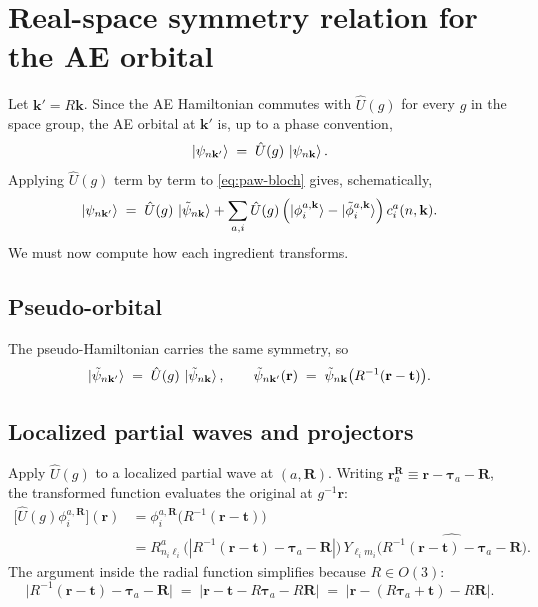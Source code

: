 \documentclass[11pt,a4paper]{article}
\newcommand{\rr}{\mathbf{r}}
\newcommand{\kk}{\mathbf{k}}
\newcommand{\RR}{\mathbf{R}}
\newcommand{\tautau}{\boldsymbol{\tau}}
\newcommand{\tvec}{\mathbf{t}}
\newcommand{\Uhat}{\hat{U}}
\begin{document}
\section{Real-space symmetry relation for the AE orbital}

Let $\kk' = R\kk$. Since the AE Hamiltonian commutes with $\Uhat(g)$ for
every $g$ in the space group, the AE orbital at $\kk'$ is, up to a phase
convention,
\begin{equation}
\ket{\psi_{n\kk'}} \;=\; \Uhat(g)\,\ket{\psi_{n\kk}}.
\label{eq:AE-symm}
\end{equation}
Applying $\Uhat(g)$ term by term to \eqref{eq:paw-bloch} gives, schematically,
\begin{equation}
\ket{\psi_{n\kk'}}
  \;=\; \Uhat(g)\,\ket{\tilde\psi_{n\kk}}
  + \sum_{a,i}\Uhat(g)\,
    \Bigl(\ket{\phi_i^{a,\kk}} - \ket{\tilde\phi_i^{a,\kk}}\Bigr)\,
    c_i^a(n,\kk).
\end{equation}
We must now compute how each ingredient transforms.

\subsection{Pseudo-orbital}

The pseudo-Hamiltonian carries the same symmetry, so
\begin{equation}
\ket{\tilde\psi_{n\kk'}} \;=\; \Uhat(g)\,\ket{\tilde\psi_{n\kk}},
\qquad
\tilde\psi_{n\kk'}(\rr) \;=\; \tilde\psi_{n\kk}\bigl(R^{-1}(\rr - \tvec)\bigr).
\label{eq:pseudo-symm}
\end{equation}

\subsection{Localized partial waves and projectors}

Apply $\Uhat(g)$ to a localized partial wave at $(a,\RR)$. Writing
$\rr_a^{\RR} \equiv \rr - \tautau_a - \RR$, the transformed function evaluates
the original at $g^{-1}\rr$:
\begin{align}
\bigl[\Uhat(g)\phi_i^{a,\RR}\bigr](\rr)
  &= \phi_i^{a,\RR}\!\bigl(R^{-1}(\rr - \tvec)\bigr) \nonumber\\
  &= R_{n_i\ell_i}^a\bigl(|R^{-1}(\rr - \tvec) - \tautau_a - \RR|\bigr)\,
     Y_{\ell_i m_i}\bigl(\widehat{R^{-1}(\rr - \tvec) - \tautau_a - \RR}\bigr).
\end{align}
The argument inside the radial function simplifies because $R \in O(3)$:
\begin{equation}
\bigl|R^{-1}(\rr - \tvec) - \tautau_a - \RR\bigr|
  \;=\; \bigl|\rr - \tvec - R\tautau_a - R\RR\bigr|
  \;=\; \bigl|\rr - (R\tautau_a + \tvec) - R\RR\bigr|.
\end{equation}
\end{document}
